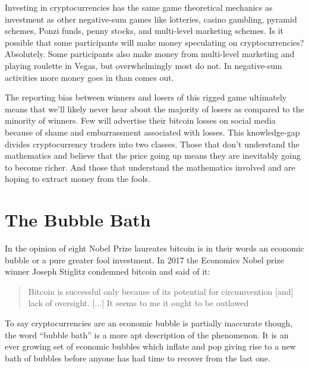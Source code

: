 
Investing in cryptocurrencies has the same game theoretical mechanics as
investment as other negative-sum games like lotteries, casino gambling, pyramid
schemes, Ponzi funds, penny stocks, and multi-level marketing schemes. Is it
possible that some participants will make money speculating on cryptocurrencies?
Absolutely. Some participants also make money from multi-level marketing and
playing roulette in Vegas, but overwhelmingly most do not. In negative-sum
activities more money goes in than comes out.


The reporting bias between winners and losers of this rigged game ultimately
means that we'll likely never hear about the majority of losers as compared to
the minority of winners. Few will advertise their bitcoin losses on social media
because of shame and embarrassment associated with losses. This knowledge-gap
divides cryptocurrency traders into two classes. Those that don't understand the
mathematics and believe that the price going up means they are inevitably going
to become richer. And those that understand the mathematics involved and are
hoping to extract money from the fools.
\cite{shifflett2018some, makarov2020trading}


\section{The Bubble Bath}


In the opinion of eight Nobel Prize laureates bitcoin is in their words an
economic bubble or a pure greater fool investment. In 2017 the Economics Nobel
prize winner Joseph Stiglitz condemned bitcoin and said of it:

\begin{quote}
Bitcoin is successful only because of its potential for circumvention [and] lack
of oversight. [...] It seems to me it ought to be outlawed
\end{quote}

To say cryptocurrencies are an economic bubble is partially inaccurate though,
the word ``bubble bath'' is a more apt description of the phenomenon. It is an
ever growing set of economic bubbles which inflate and pop giving rise to a new
bath of bubbles before anyone has had time to recover from the last one.

